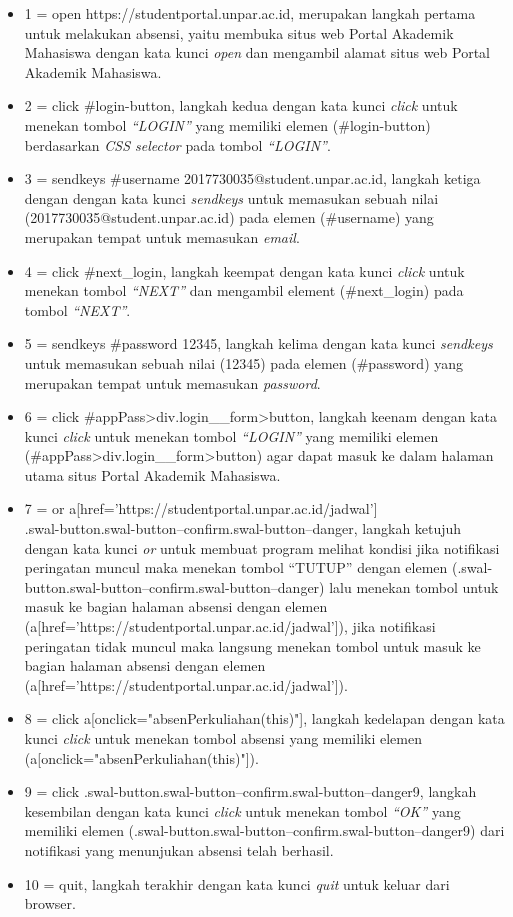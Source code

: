 \begin{itemize}
	\item 1 = open https://studentportal.unpar.ac.id, merupakan langkah pertama untuk melakukan absensi, yaitu membuka situs web Portal Akademik Mahasiswa dengan kata kunci \textit{open} dan mengambil alamat situs web Portal Akademik Mahasiswa.
	\item 2 = click \#login-button, langkah kedua dengan kata kunci \textit{click} untuk menekan tombol \textit{``LOGIN''} yang memiliki elemen (\#login-button) berdasarkan \textit{CSS selector} pada tombol \textit{``LOGIN''}.
	\item 3 = sendkeys \#username 2017730035@student.unpar.ac.id, langkah ketiga dengan dengan kata kunci \textit{sendkeys} untuk memasukan sebuah nilai (2017730035@student.unpar.ac.id) pada elemen (\#username) yang merupakan tempat untuk memasukan \textit{email}.
	\item 4 = click \#next\_login, langkah keempat dengan kata kunci \textit{click} untuk menekan tombol \textit{``NEXT''} dan mengambil element (\#next\_login) pada tombol \textit{``NEXT''}.
	\item 5 = sendkeys \#password 12345, langkah kelima dengan kata kunci \textit{sendkeys} untuk memasukan sebuah nilai (12345) pada elemen (\#password) yang merupakan tempat untuk memasukan \textit{password}.
	\item 6 = click \#appPass>div.login\_\_form>button, langkah keenam dengan kata kunci \textit{click} untuk menekan tombol \textit{``LOGIN''} yang memiliki elemen (\#appPass>div.login\_\_form>button) agar dapat masuk ke dalam halaman utama situs Portal Akademik Mahasiswa. 
	\item 7 = or a[href='https://studentportal.unpar.ac.id/jadwal'] \\ .swal-button.swal-button--confirm.swal-button--danger, langkah ketujuh dengan kata kunci \textit{or} untuk membuat program melihat kondisi jika notifikasi peringatan muncul maka menekan tombol ``TUTUP'' dengan elemen (.swal-button.swal-button--confirm.swal-button--danger) lalu menekan tombol untuk masuk ke bagian halaman absensi dengan elemen (a[href='https://studentportal.unpar.ac.id/jadwal']), jika notifikasi peringatan tidak muncul maka langsung menekan tombol untuk masuk ke bagian halaman absensi dengan elemen \\ (a[href='https://studentportal.unpar.ac.id/jadwal']).
	\item 8 = click a[onclick="absenPerkuliahan(this)"], langkah kedelapan dengan kata kunci \textit{click} untuk menekan tombol absensi yang memiliki elemen (a[onclick="absenPerkuliahan(this)"]).
	\item 9 = click .swal-button.swal-button--confirm.swal-button--danger9, langkah kesembilan dengan kata kunci \textit{click} untuk menekan tombol \textit{``OK''} yang memiliki elemen (.swal-button.swal-button--confirm.swal-button--danger9) dari notifikasi yang menunjukan absensi telah berhasil.
	\item 10 = quit, langkah terakhir dengan kata kunci \textit{quit} untuk keluar dari browser.
\end{itemize}


